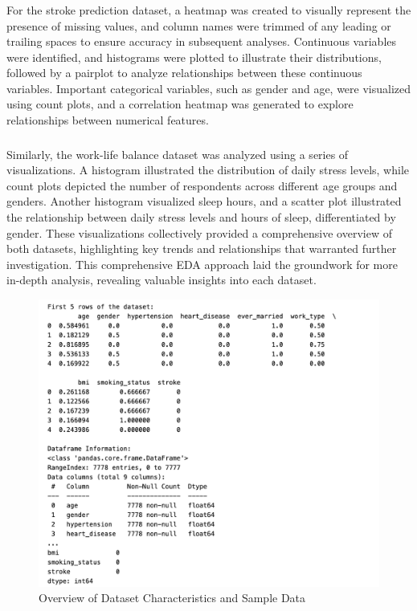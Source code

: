 \documentclass[runningheads]{llncs}
\begin{document}
\begin{enumerate}
\subsubsection{}
For the stroke prediction dataset, a heatmap was created to visually represent the presence of missing values, and column names were trimmed of any leading or trailing spaces to ensure accuracy in subsequent analyses. Continuous variables were identified, and histograms were plotted to illustrate their distributions, followed by a pairplot to analyze relationships between these continuous variables. Important categorical variables, such as gender and age, were visualized using count plots, and a correlation heatmap was generated to explore relationships between numerical features. 

\subsubsection{}
Similarly, the work-life balance dataset was analyzed using a series of visualizations. A histogram illustrated the distribution of daily stress levels, while count plots depicted the number of respondents across different age groups and genders. Another histogram visualized sleep hours, and a scatter plot illustrated the relationship between daily stress levels and hours of sleep, differentiated by gender. These visualizations collectively provided a comprehensive overview of both datasets, highlighting key trends and relationships that warranted further investigation. This comprehensive EDA approach laid the groundwork for more in-depth analysis, revealing valuable insights into each dataset.

\begin{figure}
    \centering
    \includegraphics[width=.8\linewidth]{eda1.png}
    \caption{Overview of Dataset Characteristics and Sample Data} 
    \label{fig:enter-label}
\end{figure}


\end{enumerate}
\end{document}
